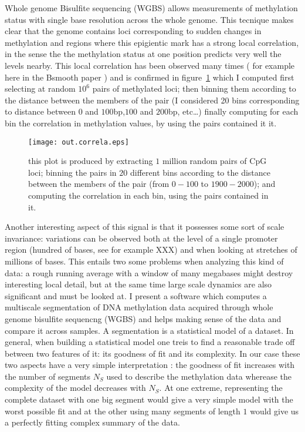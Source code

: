 \documentclass[11pt]{amsart}
\begin{document}
Whole genome Bisulfite sequencing (WGBS) allows measurements of methylation 
status with single base resolution across the whole genome. This tecnique makes 
clear that the genome contains loci corresponding to sudden changes in methylation 
and regions where this epigientic mark has a strong local
correlation, in the sense the the methylation status at one position predicts 
very well the levels nearby. 
This local correlation has been observed many times ( for example
here in the Bsmooth paper
\cite{bsmooth}) and is confirmed in figure~\ref{corr} which I computed 
first selecting at random $10^6$ pairs of  methylated loci; then binning
them according to the distance between the members of the pair (I considered 20 
bins corresponding to distance between $0$ and $100$bp,$100$ and $200$bp, etc\dots)
finally computing for each bin the correlation in methylation values, by using the pairs
contained it it.
\begin{center}
\begin{figure}\label{corr}
\texttt{[image: out.correla.eps]}
\caption{this plot is produced by extracting $1$ million random pairs of CpG loci;
binning the pairs in $20$ different bins  according to the distance between the members
of the pair (from $0-100$ to $1900-2000$); and computing the correlation in each bin,
using the pairs contained in it.}
\end{figure}
\end{center}
Another interesting aspect of this signal is that it possesses some sort of scale 
invariance: variations can be observed both at the level of a single promoter
region (hundred of bases, see for example XXX) and when looking at stretches
of millions of bases.
This entails two some problems when analyzing this kind of data: a rough
running average with a window of many megabases might destroy interesting
local detail, but at the same time large scale dynamics are also
significant and must be looked at.
I present  a software which computes a multiscale segmentation of DNA methylation 
data acquired through whole genome bisulfite sequencng (WGBS) and
helps making sense of the data and compare it across samples.
A segmentation is a statistical model of a dataset. 
In general, when building a statistical model one treis to find a reasonable 
trade off between two 
features of it: its goodness of fit and its complexity.
In our case these two aspects have a very simple interpretation : the goodness 
of fit increases with the number of segments $N_S$ used to describe the 
methylation data wherease the complexity of the model decreases with $N_S$.  
At one extreme, representing the complete dataset with one big segment would 
give a very simple model with the worst possible fit and 
at the other using many segments of length $1$ would give us a perfectly 
fitting complex summary of the data.
\end{document}
